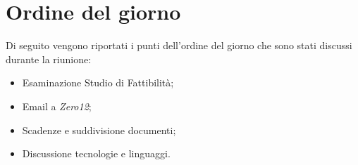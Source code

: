 \clearpage
\section{Ordine del giorno}
Di seguito vengono riportati i punti dell’ordine del giorno che sono stati discussi durante la riunione:
\begin{itemize}
	\item Esaminazione Studio di Fattibilità;
	\item Email a \emph{Zero12};
	\item Scadenze e suddivisione documenti;
	\item Discussione tecnologie e linguaggi.
\end{itemize}